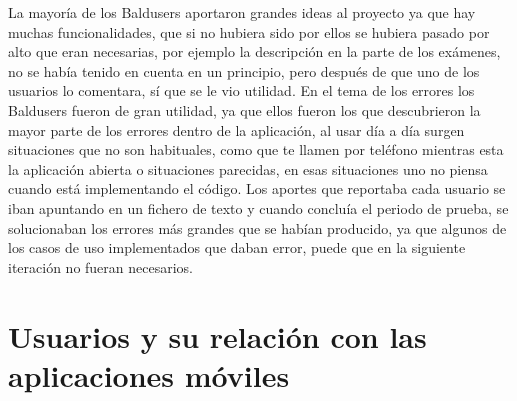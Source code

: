 La mayoría de los Baldusers aportaron grandes ideas al proyecto ya que hay muchas funcionalidades, que si no hubiera sido por ellos se hubiera pasado por alto que eran necesarias, por ejemplo la descripción en la parte de los exámenes, no se había tenido en cuenta en un principio, pero después de que uno de los usuarios lo comentara, sí que se le vio utilidad.
En el tema de los errores los Baldusers fueron de gran utilidad, ya que ellos fueron los que descubrieron la mayor parte de los errores dentro de la aplicación, al usar día a día surgen situaciones que no son habituales, como que te llamen por teléfono mientras esta la aplicación abierta o situaciones parecidas, en esas situaciones uno no piensa cuando está implementando el código.
Los aportes que reportaba cada usuario se iban apuntando en un fichero de texto y cuando concluía el periodo de prueba, se solucionaban los errores más grandes que se habían producido, ya que algunos de los casos de uso implementados que daban error, puede que en la siguiente iteración no fueran necesarios.


\section{Usuarios y su relación con las aplicaciones móviles}
\label{secc:usuarios y su relación con las aplicaciones móviles}


